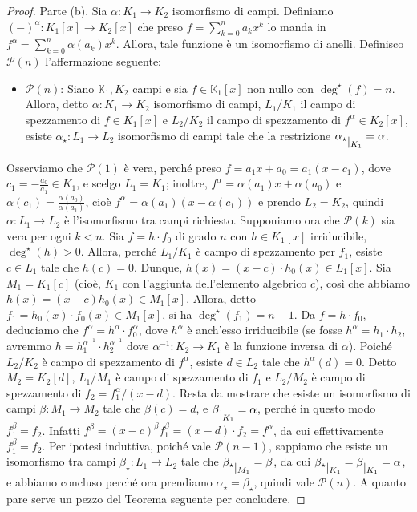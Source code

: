 \documentclass{article}
\theoremstyle{definition}
\begin{document}
\begin{proof}
\noindent Parte (b). Sia $\alpha\colon K_1\to K_2$ isomorfismo di campi. Definiamo $(-)^{\alpha}\colon K_1[x]\to K_2[x]$ che preso $f=\sum\limits_{k=0}^n a_k x^k$ lo manda in $f^{\alpha}=\sum\limits_{k=0}^n \alpha(a_k) x^k$. Allora, tale funzione è un isomorfismo di anelli. Definisco $\mathcal{P}(n)$ l'affermazione seguente: 
\begin{itemize}
\item $\mathcal{P}(n)$: Siano $\mathbb{K}_1, K_2$ campi e sia $f\in\mathbb{K}_1[x]$ non nullo con $\deg^{\star}(f)=n$. Allora, detto $\alpha\colon K_1\to K_2$ isomorfismo di campi, $L_1/K_1$ il campo di spezzamento di $f\in K_1[x]$ e $L_2/K_2$ il campo di spezzamento di $f^{\alpha}\in K_2[x]$, esiste $\alpha_{\star}\colon L_1\to L_2$ isomorfismo di campi tale che la restrizione $\alpha_{\star} \raisebox{-.5em}{$\vert_{K_1}$}=\alpha$.
\end{itemize}
Osserviamo che $\mathcal{P}(1)$ è vera, perché preso $f=a_1x+a_0=a_1(x-c_1)$, dove $c_1=-\frac{a_0}{a_1}\in K_1$, e scelgo $L_1=K_1$; inoltre, $f^{\alpha}=\alpha(a_1)x+\alpha(a_0)$ e $\alpha(c_1)=\frac{\alpha(a_0)}{\alpha(a_1)}$, cioè $f^{\alpha}=\alpha(a_1)(x-\alpha(c_1))$ e prendo $L_2=K_2$, quindi $\alpha\colon L_1\to L_2$ è l'isomorfismo tra campi richiesto. Supponiamo ora che $\mathcal{P}(k)$ sia vera per ogni $k<n$. Sia $f=h\cdot f_0$ di grado $n$ con $h\in K_1[x]$ irriducibile, $\deg^{\star}(h)>0$. Allora, perché $L_1/K_1$ è campo di spezzamento per $f_1$, esiste $c\in L_1$ tale che $h(c)=0$. Dunque, $h(x)=(x-c)\cdot h_0(x)\in L_1[x]$. Sia $M_1=K_1[c]$ (cioè, $K_1$ con l'aggiunta dell'elemento algebrico $c$), così che abbiamo $h(x)=(x-c)h_0(x)\in M_1[x]$. Allora, detto $f_1=h_0(x)\cdot f_0(x)\in M_1[x]$, si ha $\deg^{\star}(f_1)=n-1$. Da $f=h\cdot f_0$, deduciamo che $f^{\alpha}=h^{\alpha}\cdot f_0^{\alpha}$, dove $h^{\alpha}$ è anch'esso irriducibile (se fosse $h^{\alpha}=h_1\cdot h_2$, avremmo $h=h_1^{\alpha^{-1}}\cdot h_2^{\alpha^{-1}}$ dove $\alpha^{-1}\colon K_2\to K_1$ è la funzione inversa di $\alpha$). Poiché $L_2/K_2$ è campo di spezzamento di $f^{\alpha}$, esiste $d\in L_2$ tale che $h^{\alpha}(d)=0$. Detto $M_2=K_2[d]$, $L_1/M_1$ è campo di spezzamento di $f_1$ e $L_2/M_2$ è campo di spezzamento di $f_2=f_1^{\alpha}/(x-d)$. Resta da mostrare che esiste un isomorfismo di campi $\beta\colon M_1\to M_2$ tale che $\beta(c)=d$, e $\beta \raisebox{-.5em}{$\vert_{K_1}$}=\alpha$, perché in questo modo $f_1^{\beta}=f_2$. Infatti $f^{\beta}=(x-c)^{\beta}f_1^{\beta}=(x-d)\cdot f_2=f^{\alpha}$, da cui effettivamente $f_1^{\beta}=f_2$. Per ipotesi induttiva, poiché vale $\mathcal{P}(n-1)$, sappiamo che esiste un isomorfismo tra campi $\beta_{\star}\colon L_1\to L_2$ tale che $\beta_{\star} \raisebox{-.5em}{$\vert_{M_1}$}=\beta$, da cui $\beta_{\star} \raisebox{-.5em}{$\vert_{K_1}$}=\beta \raisebox{-.5em}{$\vert_{K_1}$}=\alpha$, e abbiamo concluso perché ora prendiamo $\alpha_{\star}=\beta_{\star}$, quindi vale $\mathcal{P}(n)$. A quanto pare serve un pezzo del Teorema seguente per concludere.
\end{proof}
\end{document}
